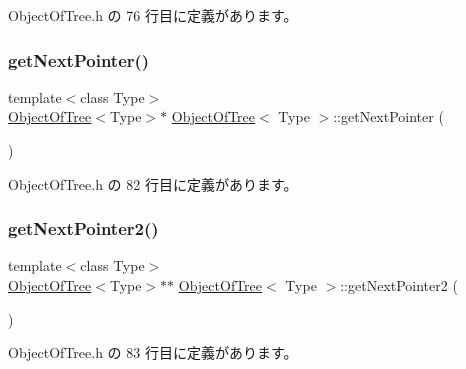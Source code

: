  Object\+Of\+Tree.\+h の 76 行目に定義があります。

\mbox{\label{class_object_of_tree_a596be7ee8c6e26a104bed5d26f7cf54e}} 
\subsubsection{\texorpdfstring{get\+Next\+Pointer()}{getNextPointer()}}
{\footnotesize\ttfamily template$<$class Type$>$ \\
\mbox{\hyperlink{class_object_of_tree}{Object\+Of\+Tree}}$<$Type$>$$\ast$ \mbox{\hyperlink{class_object_of_tree}{Object\+Of\+Tree}}$<$ Type $>$\+::get\+Next\+Pointer (\begin{DoxyParamCaption}{ }\end{DoxyParamCaption})\hspace{0.3cm}{\ttfamily [inline]}}



 Object\+Of\+Tree.\+h の 82 行目に定義があります。

\mbox{\label{class_object_of_tree_a1b5839c677aa3c678733c1aa03d4f00f}} 
\subsubsection{\texorpdfstring{get\+Next\+Pointer2()}{getNextPointer2()}}
{\footnotesize\ttfamily template$<$class Type$>$ \\
\mbox{\hyperlink{class_object_of_tree}{Object\+Of\+Tree}}$<$Type$>$$\ast$$\ast$ \mbox{\hyperlink{class_object_of_tree}{Object\+Of\+Tree}}$<$ Type $>$\+::get\+Next\+Pointer2 (\begin{DoxyParamCaption}{ }\end{DoxyParamCaption})\hspace{0.3cm}{\ttfamily [inline]}}



 Object\+Of\+Tree.\+h の 83 行目に定義があります。

\mbox{\label{class_object_of_tree_a28214e15fffb72cb50b764e2f3ac863d}} 
